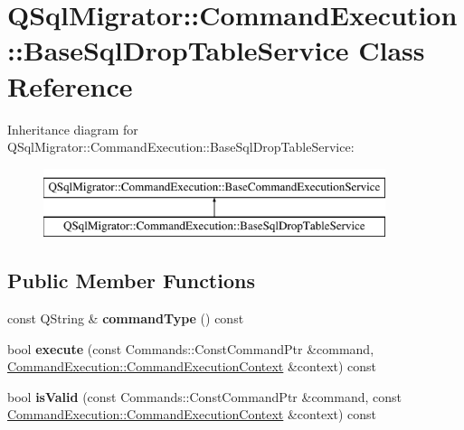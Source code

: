 \hypertarget{class_q_sql_migrator_1_1_command_execution_1_1_base_sql_drop_table_service}{}\section{Q\+Sql\+Migrator\+:\+:Command\+Execution\+:\+:Base\+Sql\+Drop\+Table\+Service Class Reference}
\label{class_q_sql_migrator_1_1_command_execution_1_1_base_sql_drop_table_service}
Inheritance diagram for Q\+Sql\+Migrator\+:\+:Command\+Execution\+:\+:Base\+Sql\+Drop\+Table\+Service\+:\begin{figure}[H]
\begin{center}
\leavevmode
\includegraphics[height=2.000000cm]{class_q_sql_migrator_1_1_command_execution_1_1_base_sql_drop_table_service}
\end{center}
\end{figure}
\subsection*{Public Member Functions}
\begin{DoxyCompactItemize}
\item 
\mbox{\label{class_q_sql_migrator_1_1_command_execution_1_1_base_sql_drop_table_service_aa9688ed5f8b080e834f4d7e8e04e8174}} 
const Q\+String \& {\bfseries command\+Type} () const
\item 
\mbox{\label{class_q_sql_migrator_1_1_command_execution_1_1_base_sql_drop_table_service_a6ee61337743cf5bc05a4898af872b6e7}} 
bool {\bfseries execute} (const Commands\+::\+Const\+Command\+Ptr \&command, \hyperlink{class_q_sql_migrator_1_1_command_execution_1_1_command_execution_context}{Command\+Execution\+::\+Command\+Execution\+Context} \&context) const
\item 
\mbox{\label{class_q_sql_migrator_1_1_command_execution_1_1_base_sql_drop_table_service_a74e154fabd0fe41c62c8cd9b34b4197a}} 
bool {\bfseries is\+Valid} (const Commands\+::\+Const\+Command\+Ptr \&command, const \hyperlink{class_q_sql_migrator_1_1_command_execution_1_1_command_execution_context}{Command\+Execution\+::\+Command\+Execution\+Context} \&context) const
\end{DoxyCompactItemize}
